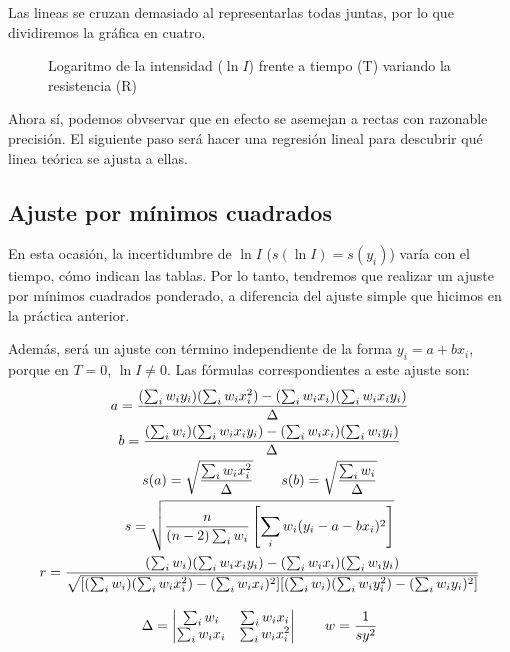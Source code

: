 \documentclass[12pt, a4paper, titlepage]{article}
\begin{document}
  Las lineas se cruzan demasiado al representarlas todas juntas, por lo que dividiremos la gráfica en cuatro.

  \begin{figure}[H]
    \hspace{0.2em} 
    \caption{Logaritmo de la intensidad ($\ln{I}$) frente a tiempo (T) variando la resistencia (R)}
  \end{figure}

  Ahora sí, podemos obvservar que en efecto se asemejan a rectas con razonable precisión. El siguiente paso será hacer una regresión lineal para descubrir qué linea teórica se ajusta a ellas.

  \newpage
  \subsection{Ajuste por mínimos cuadrados}

  En esta ocasión, la incertidumbre de $\ln{I}$ ($s(\ln{I}) = s(y_i)$) varía con el tiempo, cómo indican las tablas. Por lo tanto, tendremos que realizar un ajuste por mínimos cuadrados ponderado, a diferencia del ajuste simple que hicimos en la práctica anterior.

  Además, será un ajuste con término independiente de la forma $y_i = a + bx_i$, porque en $T=0$, $\ln{I} \ne 0$. Las fórmulas correspondientes a este ajuste son:
  \begin{gather}
    a = \frac{(\sum_i{w_i y_i})(\sum_i{w_i x_i^2}) - (\sum_i{w_i x_i})(\sum_i{w_i x_i y_i})}{\Delta} \label{ec:regwa} \\
    b = \frac{(\sum_i{w_i})(\sum_i{w_i x_i y_i}) - (\sum_i{w_i x_i})(\sum_i{w_i y_i})}{\Delta} \label{ec:regwb} \\
    s(a) = \sqrt{\frac{\sum_i{w_i x_i^2}}{\Delta}} \qquad
    s(b) = \sqrt{\frac{\sum_i{w_i}}{\Delta}} \label{ec:regwsab} \\
    s = \sqrt{\frac{n}{(n - 2) \sum_i{w_i}} \left[ \sum_i{w_i(y_i - a - bx_i)^2} \right]} \label{ec:regws} \\ \vspace{0.3cm}
    r = \frac{(\sum_i{w_i})(\sum_i{w_i x_i y_i}) - (\sum_i{w_i x_i})(\sum_i{w_i y_i})}{\sqrt{[(\sum_i{w_i})(\sum_i{w_i x_i^2}) - (\sum_i{w_i x_i})^2] [(\sum_i{w_i})(\sum_i{w_i y_i^2}) - (\sum_i{w_i y_i})^2]}} \label{ec:regwr} \\
    \Delta = \begin{vmatrix}
              \sum_i{w_i} & \sum_i{w_i x_i} \\
              \sum_i{w_i x_i} & \sum_i{w_i x_i^2}
             \end{vmatrix} \qquad
    w = \frac{1}{sy^2}
  \end{gather}
\end{document}
